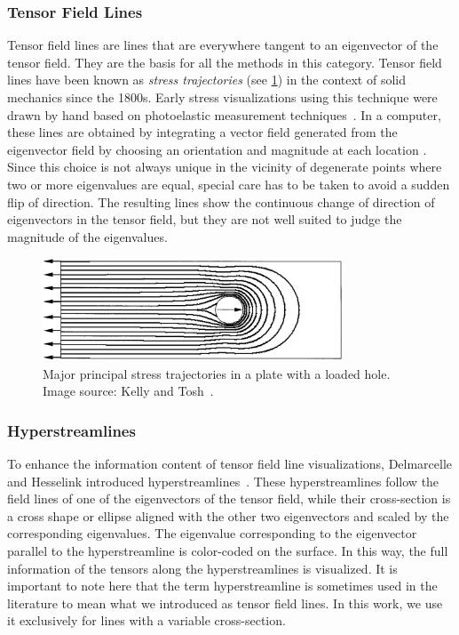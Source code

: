 \subsubsection{Tensor Field Lines} %
%
Tensor field lines are lines that are everywhere tangent to an eigenvector of
the tensor field.
%
They are the basis for all the methods in this category.
%
Tensor field lines have been known as \emph{stress trajectories} (see
\cref{fig:stress_trajectories}) in the context of solid mechanics since the
1800s.
%
Early stress visualizations using this technique were drawn by hand based on
photoelastic measurement techniques~\cite{Focht1962,Timoshenko1983}.
%
In a computer, these lines are obtained by integrating a vector field generated
from the eigenvector field by choosing an orientation and magnitude at each
location \cite{Dickinson1989,Tricoche2006}.
%
Since this choice is not always unique in the vicinity of degenerate points
where two or more eigenvalues are equal, special care has to be taken to avoid
a sudden flip of direction.
%
The resulting lines show the continuous change of direction of eigenvectors in
the tensor field, but they are not well suited to judge the magnitude of the
eigenvalues.
%
\begin{figure}[t]
    \centering
    \includegraphics[width=0.8\textwidth]{figures/stress_trajectories.png}
    \caption{Major principal stress trajectories in a plate with a loaded hole.
             Image source: Kelly and Tosh~\cite{Kelly2000}.}
    \label{fig:stress_trajectories}
\end{figure}
%

\subsubsection{Hyperstreamlines} %
%
To enhance the information content of tensor field line visualizations,
Delmarcelle and Hesselink introduced hyperstreamlines~\cite{Delmarcelle1993}.
%
These hyperstreamlines follow the field lines of one of the eigenvectors of the
tensor field, while their cross-section is a cross shape or ellipse aligned with
the other two eigenvectors and scaled by the corresponding eigenvalues.
%
The eigenvalue corresponding to the eigenvector parallel to the hyperstreamline
is color-coded on the surface.
%
In this way, the full information of the tensors along the hyperstreamlines is
visualized.
%
It is important to note here that the term hyperstreamline is sometimes used
in the literature to mean what we introduced as tensor field lines.
%
In this work, we use it exclusively for lines with a variable cross-section.
%

